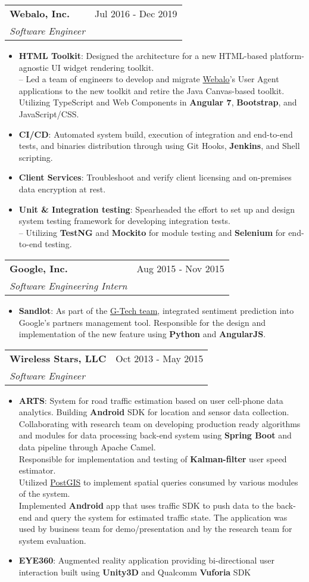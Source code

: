 \documentclass[letterpaper,11pt]{article}
\makeatletter
\newcommand{\resumeItem}[2]{
  \item\small{
    \textbf{#1}{: #2 \vspace{-2pt}}
  }
}
\newcommand{\resumeSubheading}[4]{
  \vspace{-1pt}\item
    \begin{tabular*}{0.97\textwidth}[t]{l@{\extracolsep{\fill}}r}
      \textbf{#1} & #2 \\
      \textit{\small #3} & \textit{\small #4} \\
    \end{tabular*}\vspace{-5pt}
}
\newcommand{\resumeItemListStart}{\begin{itemize}}
\newcommand{\resumeItemListEnd}{\end{itemize}\vspace{-5pt}}
\makeatother
\begin{document}
    \resumeSubheading
      {Webalo, Inc.}{Jul 2016 - Dec 2019}
      {Software Engineer}{}
      \resumeItemListStart
        \resumeItem{HTML Toolkit}
          {Designed the architecture for a new HTML-based platform-agnostic UI widget rendering toolkit.\\
          -- Led a team of engineers to develop and migrate \href{https://www.webalo.com/platform.php}{Webalo}'s User Agent applications to the new toolkit and retire the Java Canvas-based toolkit.
          Utilizing TypeScript and Web Components in \textbf{Angular 7}, \textbf{Bootstrap}, and JavaScript/CSS.}
        \resumeItem{CI/CD}
          {Automated system build, execution of integration and end-to-end tests, and binaries distribution through using Git Hooks, \textbf{Jenkins}, and Shell scripting.}
        \resumeItem{Client Services}
        	  {Troubleshoot and verify client licensing and on-premises data encryption at rest.}
        \resumeItem{Unit \& Integration testing}
          {Spearheaded the effort to set up and design system testing framework for developing integration tests.\\
          -- Utilizing \textbf{TestNG} and \textbf{Mockito} for module testing and \textbf{Selenium} for end-to-end testing.}
      \resumeItemListEnd

    \resumeSubheading
      {Google, Inc.}{Aug 2015 - Nov 2015}
      {Software Engineering Intern}{}
      \resumeItemListStart
        \resumeItem{Sandlot}
          {As part of the \href{https://careersonair.withgoogle.com/events/insidegtech}{G-Tech team}, integrated sentiment prediction into Google's partners management tool. Responsible for the design and implementation of the new feature using \textbf{Python} and \textbf{AngularJS}.}
      \resumeItemListEnd
      
\pagebreak

    \resumeSubheading
      {Wireless Stars, LLC}{Oct 2013 - May 2015}
      {Software Engineer}{}
      \resumeItemListStart
        \resumeItem{ARTS}
          {System for road traffic estimation based on user cell-phone data analytics. Building \textbf{Android} SDK for location and sensor data collection.\\
          Collaborating with research team on developing production ready algorithms and modules for data processing back-end system using \textbf{Spring Boot} and data pipeline through Apache Camel.\\
          Responsible for implementation and testing of \textbf{Kalman-filter} user speed estimator.\\
          Utilized \href{https://postgis.net/}{PostGIS} to implement spatial queries consumed by various modules of the system.\\
          Implemented \textbf{Android} app that uses traffic SDK to push data to the back-end and query the system for estimated traffic state. The application was used by business team for demo/presentation and by the research team for system evaluation.}
        \resumeItem{EYE360}
          {Augmented reality application providing bi-directional user interaction built using \textbf{Unity3D} and Qualcomm \textbf{Vuforia} SDK}
      \resumeItemListEnd
\end{document}
